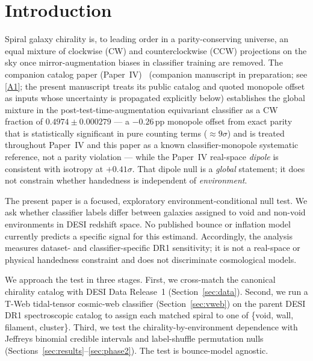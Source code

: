\documentclass[aps,prd,twocolumn,superscriptaddress,showpacs,preprintnumbers,nofootinbib,longbibliography,floatfix]{revtex4-2}
\newcommand{\repoBase}{https://github.com/Hubify-Projects/bigbounce/blob/main}
\newcommand{\paperIVarxiv}{companion manuscript in preparation}
\begin{document}
\section{Introduction}\label{sec:intro}

Spiral galaxy chirality is, to leading order in a parity-conserving
universe, an equal mixture of clockwise (CW) and counterclockwise (CCW)
projections on the sky once mirror-augmentation biases in classifier
training are removed. The companion catalog paper (Paper~IV)~\cite{golden_chirality_2026}
(\paperIVarxiv;
see \href{\repoBase/pipelines/p2\_chirality/}{[A1]}; the present manuscript
treats its public catalog and quoted monopole offset as inputs whose
uncertainty is propagated explicitly below)
establishes the global mixture in the post-test-time-augmentation
equivariant classifier as a CW fraction of $0.4974 \pm 0.000279$ ---
a $-0.26$\,pp monopole offset from exact parity that is statistically
significant in pure counting terms ($\approx\!9\sigma$) and is treated
throughout Paper~IV and this paper as a known classifier-monopole
systematic reference, not a parity violation --- while the Paper~IV
real-space \emph{dipole} is consistent with isotropy at $+0.41\sigma$.
That dipole null is a \emph{global} statement; it
does not constrain whether handedness is independent of
\emph{environment}.

The present paper is a focused, exploratory environment-conditional null
test. We ask whether classifier labels differ between galaxies assigned
to void and non-void environments in DESI redshift space. No published
bounce or inflation model currently predicts a specific signal for this
estimand. Accordingly, the analysis measures dataset- and
classifier-specific DR1 sensitivity; it is not a real-space or physical
handedness constraint and does not discriminate cosmological models.

We approach the test in three stages. First, we cross-match the
canonical chirality catalog with DESI Data Release~1
(Section~\ref{sec:data}). Second, we run a T-Web tidal-tensor cosmic-web
classifier (Section~\ref{sec:vweb}) on the parent DESI DR1 spectroscopic
catalog to assign each matched spiral to one of \{void, wall, filament,
cluster\}. Third, we test the chirality-by-environment dependence with
Jeffreys binomial credible intervals and label-shuffle permutation nulls
(Sections~\ref{sec:results}--\ref{sec:phase2}). The test is
bounce-model agnostic.
\end{document}
